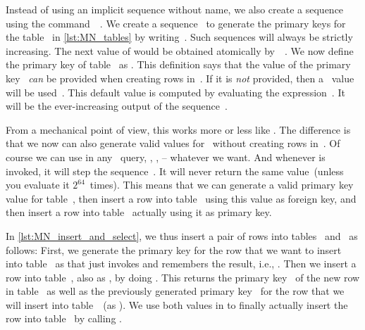 Instead of using an implicit sequence without name, we also create a sequence using the command~~\cite{PGDG:PD:CS}.
We create a sequence~ to generate the primary keys for the table~ in \cref{lst:MN_tables} by writing~.
Such sequences will always be strictly increasing.
The next value of  would be obtained atomically by~~\cite{PGDG:PD:SMF}.
We now define the primary key of table~ as .
This definition says that the value of the primary key~ \emph{can} be provided when creating rows in~.
If it is \emph{not} provided, then a~ value will be used~\cite{PGDG:PD:DV2}.
This default value is computed by evaluating the expression~.
It will be the ever-increasing output of the sequence~.%
%
\begin{sloppypar}%
From a mechanical point of view, this works more or less like \linebreak[3].
The difference is that we now can also generate valid values for~ without creating rows in~.
Of course we can use  in any \sql\ query, , ,  -- whatever we want.
And whenever  is invoked, it will step the sequence~.
It will never return the same value~(unless you evaluate it $2^{64}$~times).
This means that we can generate a valid primary key value for table~, then insert a row into table~ using this value as foreign key, and then insert a row into table~ actually using it as primary key.%
\end{sloppypar}%
%
\begin{sloppypar}%
In \cref{lst:MN_insert_and_select}, we thus insert a pair of rows into tables~ and~ as follows:
First, we generate the primary key for the row that we want to insert into table~ as  that just invokes  and remembers the result, i.e., .
Then we insert a row into table~, also as , by doing .
This  returns the primary key~ of the new row in table~ as well as the previously generated primary key~ for the row that we will insert into table~~(as ).
We use both values in to finally actually insert the row into table~ by calling .%
\end{sloppypar}%
